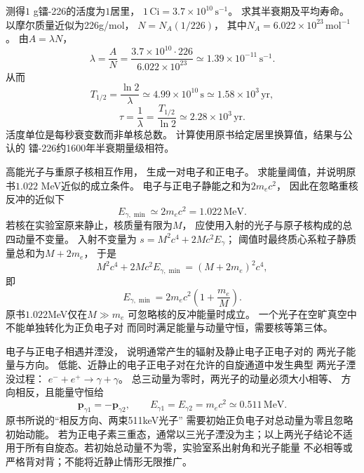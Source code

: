 \problemtext 测得$1$ g镭-226的活度为$1$居里，
$1\,\mathrm{Ci}=3.7\times10^{10}\,\mathrm{s^{-1}}$。
求其半衰期及平均寿命。
\workings
以摩尔质量近似为226g/mol，
$N=N_A(1/226)$，
其中$N_A=6.022\times10^{23}\,\mathrm{mol^{-1}}$。
由$A=\lambda N$，
\[
 \lambda=\frac{A}{N}
 =\frac{3.7\times10^{10}\cdot226}{6.022\times10^{23}}
 \simeq1.39\times10^{-11}\,\mathrm{s^{-1}}.
\]
从而
\[
 \boxed{T_{1/2}=\frac{\ln2}{\lambda}
 \simeq4.99\times10^{10}\,\mathrm s
 \simeq1.58\times10^3\,\mathrm{yr}},
\]
\[
 \boxed{\tau=\frac1\lambda
 =\frac{T_{1/2}}{\ln2}
 \simeq2.28\times10^3\,\mathrm{yr}}.
\]
\crosscheck 活度单位是每秒衰变数而非单核总数。
计算使用原书给定居里换算值，结果与公认的
镭-226约1600年半衰期量级相符。

\problemtext 高能光子与重原子核相互作用，
生成一对电子和正电子。
求能量阈值，并说明原书$1.022$ MeV近似的成立条件。
\workings
电子与正电子静能之和为$2m_ec^2$，
因此在忽略重核反冲的近似下
\[
 \boxed{E_{\gamma,\min}\simeq2m_ec^2
 =1.022\,\mathrm{MeV}}.
\]
若核在实验室原来静止，核质量有限为$M$，
应使用入射的光子与原子核构成的总四动量不变量。
入射不变量为
$s=M^2c^4+2Mc^2E_\gamma$；
阈值时最终质心系粒子静质量总和为$M+2m_e$，
于是
\[
 M^2c^4+2Mc^2E_{\gamma,\min}
 =(M+2m_e)^2c^4,
\]
即
\[
 \boxed{E_{\gamma,\min}
 =2m_ec^2\left(1+\frac{m_e}{M}\right)}.
\]
\crosscheck 原书$1.022$MeV仅在$M\gg m_e$
可忽略核的反冲能量时成立。
一个光子在空旷真空中不能单独转化为正负电子对
而同时满足能量与动量守恒，需要核等第三体。

\problemtext 电子与正电子相遇并湮没，
说明通常产生的辐射及静止电子正电子对的
两光子能量与方向。
\workings
低能、近静止的电子正电子对在允许的自旋通道中发生典型
两光子湮没过程：
$e^-+e^+\to\gamma+\gamma$。
总三动量为零时，两光子的动量必须大小相等、
方向相反，且能量守恒给
\[
 \boxed{\bm p_{\gamma1}=-\bm p_{\gamma2}},
 \qquad
 \boxed{E_{\gamma1}=E_{\gamma2}
 =m_ec^2\simeq0.511\,\mathrm{MeV}}.
\]
\crosscheck 原书所说的“相反方向、两束511keV光子”
需要初始正负电子对总动量为零且忽略初始动能。
若为正电子素三重态，通常以三光子湮没为主；以上两光子结论不适用于所有自旋态。若初始总动量不为零，实验室系出射角和光子能量
不必相等或严格背对背；不能将近静止情形无限推广。
